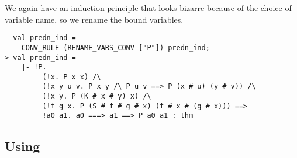 \documentclass[12pt]{article}
\begin{document}
We again have an induction principle that looks bizarre because of the
choice of variable name, so we rename the bound variables.
\begin{session}\begin{verbatim}
- val predn_ind =
    CONV_RULE (RENAME_VARS_CONV ["P"]) predn_ind;
> val predn_ind =
    |- !P.
         (!x. P x x) /\
         (!x y u v. P x y /\ P u v ==> P (x # u) (y # v)) /\
         (!x y. P (K # x # y) x) /\
         (!f g x. P (S # f # g # x) (f # x # (g # x))) ==>
         !a0 a1. a0 ===> a1 ==> P a0 a1 : thm
\end{verbatim}\end{session}

\subsection{Using \con{RTC}}
\label{sec:Using-RTC}
\end{document}
